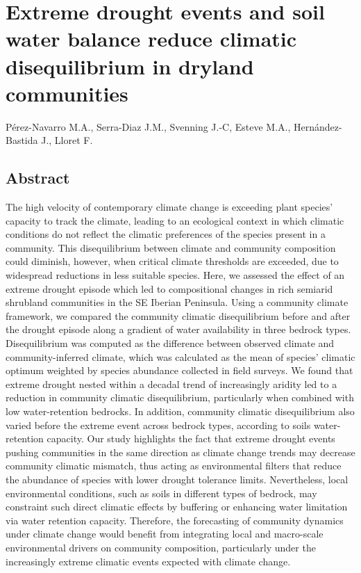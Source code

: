 \documentclass[11pt,twoside]{reedthesis}
\begin{document}
\chapter[Climatic disequilibrium reduction in dryland communities]{Extreme drought events and soil water balance reduce climatic disequilibrium in dryland communities}

\setlength{\parindent}{0pt} Pérez-Navarro M.A., Serra-Diaz J.M.,
Svenning J.-C, Esteve M.A., Hernández-Bastida J., Lloret F.

\newpage

\setlength{\parindent}{30pt}

\section*{Abstract}

The high velocity of contemporary climate change is exceeding plant
species' capacity to track the climate, leading to an ecological context
in which climatic conditions do not reflect the climatic preferences of
the species present in a community. This disequilibrium between climate
and community composition could diminish, however, when critical climate
thresholds are exceeded, due to widespread reductions in less suitable
species. Here, we assessed the effect of an extreme drought episode
which led to compositional changes in rich semiarid shrubland
communities in the SE Iberian Peninsula. Using a community climate
framework, we compared the community climatic disequilibrium before and
after the drought episode along a gradient of water availability in
three bedrock types. Disequilibrium was computed as the difference
between observed climate and community-inferred climate, which was
calculated as the mean of species' climatic optimum weighted by species
abundance collected in field surveys. We found that extreme drought
nested within a decadal trend of increasingly aridity led to a reduction
in community climatic disequilibrium, particularly when combined with
low water-retention bedrocks. In addition, community climatic
disequilibrium also varied before the extreme event across bedrock
types, according to soils water-retention capacity. Our study highlights
the fact that extreme drought events pushing communities in the same
direction as climate change trends may decrease community climatic
mismatch, thus acting as environmental filters that reduce the abundance
of species with lower drought tolerance limits. Nevertheless, local
environmental conditions, such as soils in different types of bedrock,
may constraint such direct climatic effects by buffering or enhancing
water limitation via water retention capacity. Therefore, the
forecasting of community dynamics under climate change would benefit
from integrating local and macro-scale environmental drivers on
community composition, particularly under the increasingly extreme
climatic events expected with climate change.\par
\newpage
\end{document}
